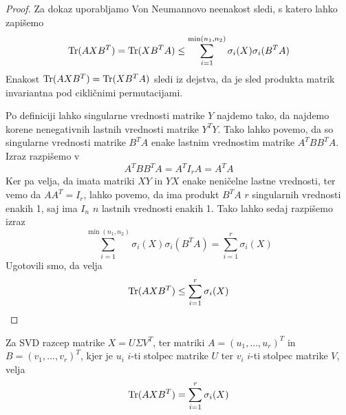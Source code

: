 \begin{proof}
    Za dokaz uporabljamo Von Neumannovo neenakost sledi, s katero lahko zapišemo
    \[
        \text{Tr}(AXB^T) = \text{Tr}(XB^TA) \leq \sum^{\min(n_1, n_2)}_{i=1} \sigma_i(X) \sigma_i(B^TA)
    \]
    Enakost $\text{Tr}(AXB^T) = \text{Tr}(XB^TA)$ sledi iz dejstva, da je sled produkta matrik invariantna pod cikličnimi permutacijami.

    Po definiciji lahko singularne vrednosti matrike $Y$ najdemo tako, da najdemo korene nenegativnih lastnih vrednosti matrike $Y^TY$. Tako lahko povemo, da so singularne vrednosti matrike $B^TA$ enake lastnim vrednostim matrike $A^TBB^TA$. Izraz razpišemo v
    \[
        A^TBB^TA = A^TI_rA = A^TA
    \]
    Ker pa velja, da imata matriki $XY$ in $YX$ enake neničelne lastne vrednosti, ter vemo da $AA^T = I_r$, lahko povemo, da ima produkt $B^TA$ $r$ singularnih vrednosti enakih 1, saj ima $I_n$ $n$ lastnih vrednosti enakih 1.
    Tako lahko sedaj razpišemo izraz
    \[
        \sum^{\min(n_1, n_2)}_{i=1} \sigma_i(X) \sigma_i(B^TA) = \sum^{r}_{i=1} \sigma_i(X)
    \]
    Ugotovili smo, da velja
    \begin{equation}
        \label{2806-1320}
        \text{Tr}(AXB^T) \leq \sum^{r}_{i=1} \sigma_i(X)
    \end{equation}
\end{proof}

\begin{theorem}
Za SVD razcep matrike $X = U \Sigma V^T$, ter matriki
$A = (u_1, \hdots , u_r)^T$ in $B = (v_1, \hdots , v_r)^T$,
kjer je $u_i$ $i$-ti stolpec matrike $U$ ter $v_i$ $i$-ti stolpec
matrike $V$, velja \[\text{Tr}(AXB^T) = \sum^{r}_{i=1} \sigma_i(X)\]
\end{theorem}

